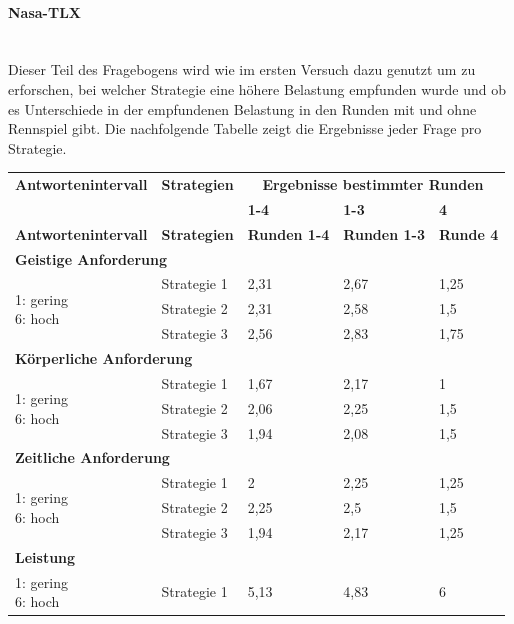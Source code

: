 \documentclass[12pt,a4paper]{scrartcl}
\begin{document}
\paragraph{Nasa-TLX}
~\\
Dieser Teil des Fragebogens wird wie im ersten Versuch dazu genutzt um zu erforschen, bei welcher Strategie eine höhere Belastung empfunden wurde und ob es Unterschiede in der empfundenen Belastung in den Runden mit und ohne Rennspiel gibt. 
Die nachfolgende Tabelle zeigt die Ergebnisse jeder Frage pro Strategie.
\begin{longtable}{|p{4cm}|p{2cm}|p{2cm}|p{2cm}|p{2cm}|}
	\hline
		\textbf{Antwortenintervall}&\textbf{Strategien}&\multicolumn{3}{c|}{\textbf{Ergebnisse bestimmter Runden}}\\
	&&\textbf{1-4}&\textbf{1-3} &\textbf{4}\\
	\hline
	\endfirsthead
	\hline
	\textbf{Antwortenintervall}&\textbf{Strategien}&\textbf{Runden 1-4}&\textbf{Runden 1-3} &\textbf{Runde 4}\\
	\hline
	\endhead
		\multicolumn{5}{l}{\textbf{Geistige Anforderung}}\\
		\hline
\multirow{3}{4cm}{1: gering \newline 6: hoch} & Strategie 1 &  2,31 & 2,67 & 1,25 \\
 & Strategie 2 & 2,31 & 2,58 & 1,5\\
 & Strategie 3 & 2,56 & 2,83 & 1,75 \\
\hline
		\multicolumn{5}{l}{\textbf{Körperliche Anforderung}}\\
		\hline
\multirow{3}{4cm}{1: gering \newline 6: hoch} & Strategie 1 & 1,67 & 2,17 & 1 \\
 & Strategie 2 & 2,06 & 2,25 & 1,5 \\
 & Strategie 3 & 1,94 & 2,08 & 1,5 \\
\hline
		\multicolumn{5}{l}{\textbf{Zeitliche Anforderung}}\\
		\hline
\multirow{3}{4cm}{1: gering \newline 6: hoch} & Strategie 1 & 2 & 2,25 & 1,25 \\
 & Strategie 2 & 2,25 & 2,5 & 1,5 \\
 & Strategie 3 & 1,94 & 2,17 & 1,25 \\
\hline
		\multicolumn{5}{l}{\textbf{Leistung}}\\
		\hline
\multirow{3}{4cm}{1: gering \newline 6: hoch} & Strategie 1 & 5,13 & 4,83 & 6 \\

\end{longtable}
\end{document}
